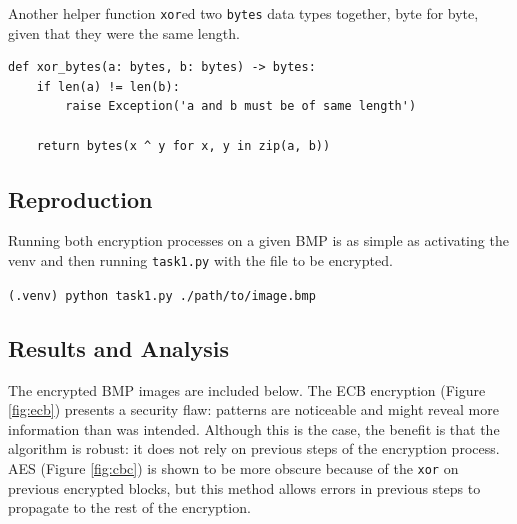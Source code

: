 \documentclass[11pt]{article}
\begin{document}
Another helper function {\tt xor}ed two {\tt bytes} data types together, byte for byte, given that they were the same length.

\begin{lstlisting}
def xor_bytes(a: bytes, b: bytes) -> bytes:
    if len(a) != len(b):
        raise Exception('a and b must be of same length')
    
    return bytes(x ^ y for x, y in zip(a, b))
\end{lstlisting}

\subsection*{Reproduction}

Running both encryption processes on a given BMP is as simple as activating the venv and then running \verb|task1.py| with the file to be encrypted.

\verb|(.venv) python task1.py ./path/to/image.bmp|

\subsection*{Results and Analysis}

The encrypted BMP images are included below. The ECB encryption (Figure \ref{fig:ecb}) presents a security flaw: patterns are noticeable and might reveal more information than was intended. Although this is the case, the benefit is that the algorithm is robust: it does not rely on previous steps of the encryption process. AES (Figure \ref{fig:cbc}) is shown to be more obscure because of the \verb|xor| on previous encrypted blocks, but this method allows errors in previous steps to propagate to the rest of the encryption.
\end{document}
